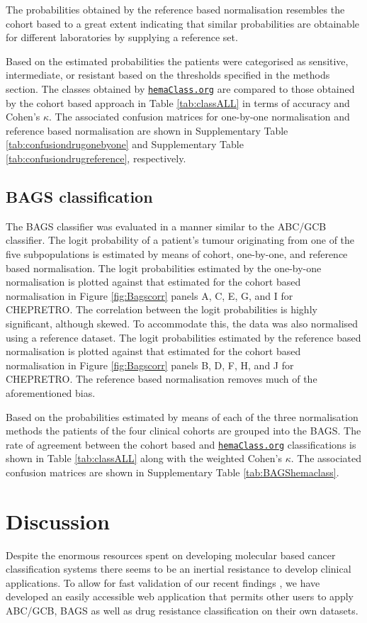 \documentclass{article}
\newcommand{\hemaClass}{\href{http://hemaClass.org}{\texttt{hemaClass.org}}}
\begin{document}
The probabilities obtained by the reference based normalisation resembles the cohort based to a great extent indicating that similar probabilities are obtainable for different laboratories by supplying a reference set.

Based on the estimated probabilities the patients were categorised as sensitive, intermediate, or resistant based on the thresholds specified in the methods section.
The classes obtained by \hemaClass{} are compared to those obtained by the cohort based approach in Table \ref{tab:classALL} in terms of accuracy and Cohen's $\kappa$.
The associated confusion matrices for one-by-one normalisation and reference based normalisation are shown in Supplementary Table \ref{tab:confusiondrugonebyone} and Supplementary Table \ref{tab:confusiondrugreference}, respectively.

\subsection{BAGS classification}

The BAGS classifier was evaluated in a manner similar to the ABC/GCB classifier.
The logit probability of a patient's tumour originating from one of the five subpopulations is estimated by means of cohort, one-by-one, and reference based normalisation.
The logit probabilities estimated by the one-by-one normalisation is plotted against that estimated for the cohort based normalisation in Figure \ref{fig:Bagscorr} panels A, C, E, G, and I for CHEPRETRO.
The correlation between the logit probabilities is highly significant, although skewed.
To accommodate this, the data was also normalised using a reference dataset.
The logit probabilities estimated by the reference based normalisation is plotted against that estimated for the cohort based normalisation in Figure \ref{fig:Bagscorr} panels B, D, F, H, and J for CHEPRETRO.
The reference based normalisation removes much of the aforementioned bias.

Based on the probabilities estimated by means of each of the three normalisation methods the patients of the four clinical cohorts are grouped into the BAGS.
The rate of agreement between the cohort based and \hemaClass{} classifications is shown in Table \ref{tab:classALL} along with the weighted Cohen's $\kappa$.
The associated confusion matrices are shown in Supplementary Table \ref{tab:BAGShemaclass}.




\section{Discussion}
Despite the enormous resources spent on developing molecular based cancer classification systems there seems to be an inertial resistance to develop clinical applications.
To allow for fast validation of our recent findings \citep{Dybkaer2013, Falgreen2013c}, we have developed an easily accessible web application that permits other users to apply ABC/GCB, BAGS as well as drug resistance classification on their own datasets.
\end{document}
